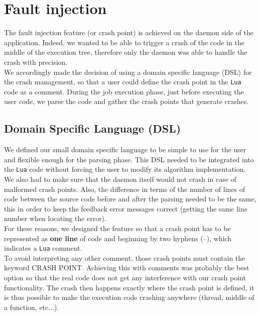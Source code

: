\documentclass{eplmastersthesis}
\begin{document}
    \section{Fault injection}

      The fault injection feature (or crash point) is achieved on the daemon
      side of the application. Indeed, we wanted to be able to trigger a crash
      of the code in the middle of the execution tree, therefore only the
      daemon was able to handle the crash with precision.\\

      We accordingly made the decision of using a domain specific language (DSL)
      for the crash management, so that a user could define the crash point
      in the \texttt{Lua} code as a comment. During the job execution phase, just before
      executing the user code, we parse the code and gather the crash
      points that generate crashes.

      \subsection{Domain Specific Language (DSL)}

        We defined our small domain specific language to be simple to use
        for the user and flexible enough for the parsing phase. This DSL
        needed to be integrated into the \texttt{Lua} code without forcing the user to
        modify its algorithm implementation. We also had to make sure that the
        daemon itself would not crash in case of malformed crash points.
        Also, the difference in terms of the number of lines of code between the
        source code before and after the parsing needed to be the same, this in
        order to keep the feedback error messages correct (getting the same line
        number when locating the error).\\

        For these reasons, we designed the feature so that a crash point has
        to be represented as \textbf{one line} of code and beginning by
        two hyphens (--), which indicates a \texttt{Lua} comment.\\
        To avoid interpreting any other comment, those crash points must
        contain the keyword \textsc{CRASH POINT}. Achieving this with comments
        was probably the best option so that the real code does not get any
        interference with our crash point functionality. The crash then
        happens exactly where the crash point is defined, it is thus
        possible to make the execution code crashing anywhere (thread, middle
        of a function, etc...).\\
\end{document}
